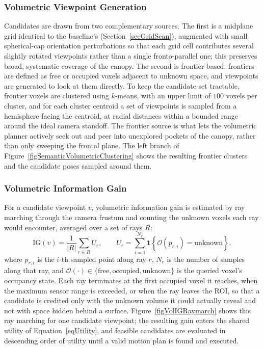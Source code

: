\subsubsection{Volumetric Viewpoint Generation} \label{secVolViewpointGen}

Candidates are drawn from two complementary sources.
The first is a midplane grid identical to the baseline's
(Section~\ref{secGridScan}), augmented with small spherical-cap orientation
perturbations so that each grid cell contributes several slightly rotated
viewpoints rather than a single fronto-parallel one; this preserves broad,
systematic coverage of the canopy.
The second is frontier-based: frontiers are defined as free or occupied
voxels adjacent to unknown space, and viewpoints are generated to look at
them directly.
To keep the candidate set tractable, frontier voxels are clustered using
$k$-means, with an upper limit of $100$ voxels per cluster, and for each
cluster centroid a set of viewpoints is sampled from a hemisphere facing
the centroid, at radial distances within a bounded range around the ideal
camera standoff.
The frontier source is what lets the volumetric planner actively seek out
and peer into unexplored pockets of the canopy, rather than only sweeping
the frontal plane.
The left branch of Figure~\ref{figSemanticVolumetricClustering} shows the
resulting frontier clusters and the candidate poses sampled around them.

\subsubsection{Volumetric Information Gain} \label{secVolIG}

For a candidate viewpoint $v$, volumetric information gain is estimated by
ray marching through the camera frustum and counting the unknown voxels
each ray would encounter, averaged over a set of rays $R$:
\begin{equation}
\mathrm{IG}(v) = \frac{1}{|R|} \sum_{r \in R} U_r,
\qquad
U_r = \sum_{i=1}^{N_r} \mathbf{1}\!\left\{ \mathcal{O}(p_{r,i}) = \text{unknown} \right\},
\label{eqVolIG}
\end{equation}
where $p_{r,i}$ is the $i$-th sampled point along ray $r$, $N_r$ is the
number of samples along that ray, and $\mathcal{O}(\cdot) \in
\{\text{free}, \text{occupied}, \text{unknown}\}$ is the queried voxel's
occupancy state.
Each ray terminates at the first occupied voxel it reaches, when the
maximum sensor range is exceeded, or when the ray leaves the ROI, so that a
candidate is credited only with the unknown volume it could actually reveal
and not with space hidden behind a surface.
Figure~\ref{figVolIGRaymarch} shows this ray marching for one candidate
viewpoint; the resulting gain enters the shared utility of
Equation~\ref{eqUtility}, and feasible candidates are evaluated in
descending order of utility until a valid motion plan is found and
executed.

